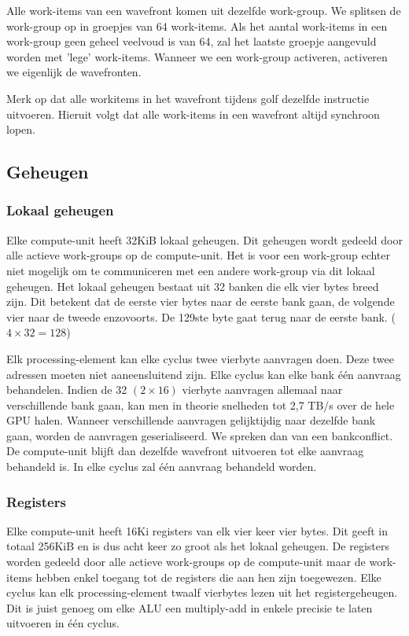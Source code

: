 Alle work-items van een wavefront komen uit dezelfde work-group. We splitsen de work-group op in groepjes van 64 work-items. Als het aantal work-items in een work-group geen geheel veelvoud is van 64, zal het laatste groepje aangevuld worden met 'lege' work-items. Wanneer we een work-group activeren, activeren we eigenlijk de wavefronten.

Merk op dat alle workitems in het wavefront tijdens golf dezelfde instructie uitvoeren. Hieruit volgt dat alle work-items in een wavefront altijd synchroon lopen.



\subsection{Geheugen}

\subsubsection{Lokaal geheugen}
Elke compute-unit heeft 32KiB lokaal geheugen. Dit geheugen wordt gedeeld door alle actieve work-groups op de compute-unit. Het is voor een work-group echter niet mogelijk om te communiceren met een andere work-group via dit lokaal geheugen. Het lokaal geheugen bestaat uit 32 banken die elk vier bytes breed zijn. Dit betekent dat de eerste vier bytes naar de eerste bank gaan, de volgende vier naar de tweede enzovoorts. De 129ste byte gaat terug naar de eerste bank. ($4 \times 32 = 128$)

Elk processing-element kan elke cyclus twee vierbyte aanvragen doen. Deze twee adressen moeten niet aaneensluitend zijn. Elke cyclus kan elke bank \'e\'en aanvraag behandelen. Indien de 32 $(2 \times 16)$ vierbyte aanvragen allemaal naar verschillende bank gaan, kan men in theorie snelheden tot 2,7 TB/s over de hele GPU halen. Wanneer verschillende aanvragen gelijktijdig naar dezelfde bank gaan, worden de aanvragen geserialiseerd. We spreken dan van een bankconflict. De compute-unit blijft dan dezelfde wavefront uitvoeren tot elke aanvraag behandeld is. In elke cyclus zal \'e\'en aanvraag behandeld worden.

\subsubsection{Registers}
Elke compute-unit heeft 16Ki registers van elk vier keer vier bytes. Dit geeft in totaal 256KiB en is dus acht keer zo groot als het lokaal geheugen. De registers worden gedeeld door alle actieve work-groups op de compute-unit maar de work-items hebben enkel toegang tot de registers die aan hen zijn toegewezen. Elke cyclus kan elk processing-element twaalf vierbytes lezen uit het registergeheugen. Dit is juist genoeg om elke ALU een multiply-add in enkele precisie te laten uitvoeren in \'e\'en cyclus.

